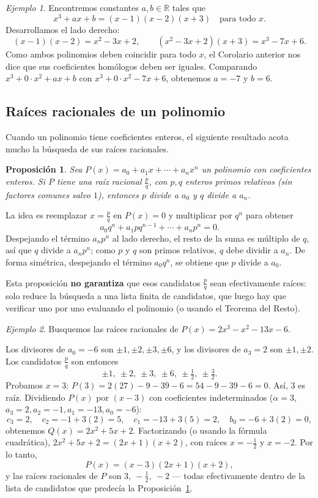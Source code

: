 \documentclass[11pt]{article}
\newtheorem{proposicion}{Proposición}[section]
\theoremstyle{remark}
\newtheorem*{ejemplo}{Ejemplo}
\begin{document}
\begin{ejemplo}
Encontremos constantes $a, b \in \mathbb{R}$ tales que
$$x^3 + ax + b = (x-1)(x-2)(x+3) \quad \text{para todo } x.$$
Desarrollamos el lado derecho:
$$(x-1)(x-2) = x^2 - 3x + 2, \qquad (x^2-3x+2)(x+3) = x^3 - 7x + 6.$$
Como ambos polinomios deben coincidir para todo $x$, el Corolario anterior
nos dice que sus coeficientes homólogos deben ser iguales. Comparando
$x^3 + 0\cdot x^2 + ax + b$ con $x^3 + 0 \cdot x^2 - 7x + 6$, obtenemos
$a = -7$ y $b = 6$.
\end{ejemplo}

\subsection{Raíces racionales de un polinomio}

Cuando un polinomio tiene coeficientes enteros, el siguiente resultado acota
mucho la búsqueda de sus raíces racionales.

\begin{proposicion}\label{prop:raicesracionales}
Sea $P(x) = a_0 + a_1x + \cdots + a_nx^n$ un polinomio con coeficientes
enteros. Si $P$ tiene una raíz racional $\frac{p}{q}$, con $p,q$ enteros
primos relativos (sin factores comunes salvo $1$), entonces $p$ divide a
$a_0$ y $q$ divide a $a_n$.
\end{proposicion}

La idea es reemplazar $x=\frac{p}{q}$ en $P(x)=0$ y multiplicar por $q^n$
para obtener
$$a_0q^n + a_1pq^{n-1} + \cdots + a_np^n = 0.$$
Despejando el término $a_np^n$ al lado derecho, el resto de la suma es
múltiplo de $q$, así que $q$ divide a $a_np^n$; como $p$ y $q$ son primos
relativos, $q$ debe dividir a $a_n$. De forma simétrica, despejando el
término $a_0q^n$, se obtiene que $p$ divide a $a_0$.

Esta proposición \textbf{no garantiza} que esos candidatos $\frac{p}{q}$ sean
efectivamente raíces: solo reduce la búsqueda a una lista finita de
candidatos, que luego hay que verificar uno por uno evaluando el polinomio
(o usando el Teorema del Resto).

\begin{ejemplo}
Busquemos las raíces racionales de $P(x) = 2x^3 - x^2 - 13x - 6$.

Los divisores de $a_0 = -6$ son $\pm1,\pm2,\pm3,\pm6$, y los divisores de
$a_3 = 2$ son $\pm1,\pm2$. Los candidatos $\frac{p}{q}$ son entonces
$$\pm1,\ \pm2,\ \pm3,\ \pm6,\ \pm\tfrac12,\ \pm\tfrac32.$$
Probamos $x=3$: $P(3) = 2(27) - 9 - 39 - 6 = 54-9-39-6=0$. Así, $3$ es raíz.
Dividiendo $P(x)$ por $(x-3)$ con coeficientes indeterminados ($\alpha=3$,
$a_3=2,a_2=-1,a_1=-13,a_0=-6$):
$$c_3=2,\quad c_2=-1+3(2)=5,\quad c_1=-13+3(5)=2,\quad b_0=-6+3(2)=0,$$
obtenemos $Q(x) = 2x^2+5x+2$. Factorizando (o usando la fórmula
cuadrática), $2x^2+5x+2 = (2x+1)(x+2)$, con raíces $x=-\tfrac12$ y $x=-2$.
Por lo tanto,
$$P(x) = (x-3)(2x+1)(x+2),$$
y las raíces racionales de $P$ son $3,\ -\tfrac12,\ -2$ — todas efectivamente
dentro de la lista de candidatos que predecía la Proposición~\ref{prop:raicesracionales}.
\end{ejemplo}
\end{document}
